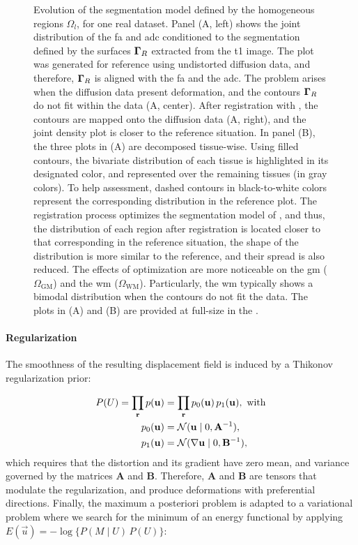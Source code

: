 \begin{figure*}

\caption{%
Evolution of the segmentation model defined by the homogeneous regions $\Omega_l$,
  for one real dataset.
Panel (A, left) shows the joint distribution of the \gls*{fa} and \gls*{adc} conditioned to
  the segmentation \omegaset{} defined by the surfaces $\boldsymbol{\Gamma}_R$ extracted from
  the \gls*{t1} image.
The plot was generated for reference using undistorted diffusion data, and
  therefore, $\boldsymbol{\Gamma}_R$ is aligned with the \gls*{fa} and the \gls*{adc}.
The problem arises when the diffusion data present deformation, and the
  contours $\boldsymbol{\Gamma}_R$ do not fit within the data (A, center).
After registration with \regseg{}, the contours are mapped onto the
  diffusion data (A, right), and the joint density plot is closer to the reference
  situation.
In panel (B), the three plots in (A) are decomposed tissue-wise.
Using filled contours, the bivariate distribution of each tissue is highlighted in its designated color,
  and represented over the remaining tissues (in gray colors).
To help assessment, dashed contours in black-to-white colors represent
  the corresponding distribution in the reference plot.
The registration process optimizes the segmentation model of \regseg{},
  and thus, the distribution of each region after registration is located
  closer to that corresponding in the reference situation, the shape of the distribution
  is more similar to the reference, and their spread is also reduced.
The effects of optimization are more noticeable on the \gls*{gm} ($\Omega_\text{GM}$) and
  the \gls*{wm} ($\Omega_\text{WM}$).
Particularly, the \gls*{wm} typically shows a bimodal distribution when the contours
  \gammaset{} do not fit the data.
{\color{revcolor} The plots in (A) and (B) are provided at full-size in the
  .}
}\label{fig:regseg-model}
\end{figure*}

\paragraph*{Regularization}
The smoothness of the resulting displacement field is induced
  by a Thikonov regularization prior:

  \begin{align}
  P(U) = \underset{\vec{r}}{\prod}\, p(\vec{u}) &=
  \underset{\vec{r}}{\prod}\, p_0(\vec{u}) \, p_1(\vec{u}), \text{ with} \\
  p_0(\vec{u}) &= \mathcal{N}( \vec{u} \mid 0, \mathbf{A}^{-1}), \notag\\
  p_1(\vec{u}) &= \mathcal{N}(  \nabla \vec{u} \mid 0, \mathbf{B}^{-1}),
  \label{eq:regseg-thikonov}
  \end{align}
 which requires that the distortion and its gradient have zero mean,
   and variance governed by the matrices $\mathbf{A}$ and $\mathbf{B}$.
Therefore, $\mathbf{A}$ and $\mathbf{B}$ are tensors that modulate the regularization, and
  produce deformations with preferential directions.
Finally, the maximum a posteriori problem is adapted to a variational problem where we search for
  the minimum of an energy functional by applying $E(\vec{u}) = -\log \{P( M \mid U) \, P(U)\}$:


